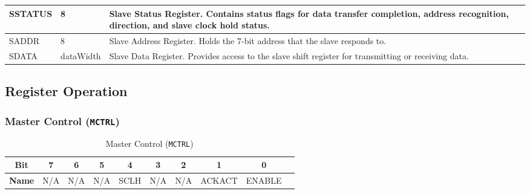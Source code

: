 \begin{longtable}[H]{
  | p{}
  | p{}
  | p{} |
  }
  SSTATUS &   
  8 &   
  Slave Status Register. Contains status flags for data transfer completion, address recognition, direction, and slave clock hold status. \\ \hline

  SADDR &   
  8 &   
  Slave Address Register. Holds the 7-bit address that the slave responds to. \\ \hline

  SDATA &   
  dataWidth &   
  Slave Data Register. Provides access to the slave shift register for transmitting or receiving data. \\ \hline

\end{longtable}
\captionsetup{aboveskip=0pt}
\label{table:register}

\subsection{Register Operation}

\subsubsection{Master Control (\texttt{MCTRL})}
\label{sec:mctrl}
  
\begin{table}[H]
    \centering
    \caption{Master Control (\texttt{MCTRL})}
    \begin{tabular}{@{}cccccccccc@{}}
        \toprule
        \textbf{Bit} & 7 & 6 & 5 & 4 & 3 & 2 & 1 & 0 \\ \midrule
        \textbf{Name} & N/A & N/A & N/A & SCLH & N/A & N/A & ACKACT & ENABLE \\ \bottomrule
    \end{tabular}
    \label{tab:mctrl}
\end{table}

